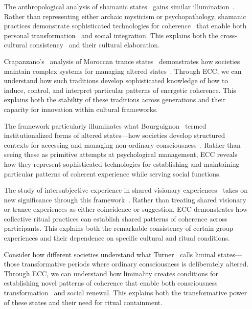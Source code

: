 The anthropological analysis of shamanic states~ gains similar illumination~\cite{noll1983shamanism,noll1985mental}. Rather than representing either archaic mysticism or psychopathology, shamanic practices demonstrate sophisticated technologies for coherence~ that enable both personal transformation~ and social integration. This explains both the cross-cultural consistency~ and their cultural elaboration.

Crapanzano's~\cite{crapanzano1973hamadsha} analysis of Moroccan trance states~ demonstrates how societies maintain complex systems for managing altered states~\cite{houseman1998naven}. Through ECC, we can understand how such traditions develop sophisticated knowledge of how to induce, control, and interpret particular patterns of energetic coherence. This explains both the stability of these traditions across generations and their capacity for innovation within cultural frameworks.

The framework particularly illuminates what Bourguignon~\cite{bourguignon1976possession} termed institutionalized forms of altered states—how societies develop structured contexts for accessing and managing non-ordinary consciousness~\cite{rappaport1999ritual}. Rather than seeing these as primitive attempts at psychological management, ECC reveals how they represent sophisticated technologies for establishing and maintaining particular patterns of coherent experience while serving social functions.

The study of intersubjective experience in shared visionary experiences~ takes on new significance through this framework~\cite{rouget1985music,thompson2001radical}. Rather than treating shared visionary or trance experiences as either coincidence or suggestion, ECC demonstrates how collective ritual practices can establish shared patterns of coherence across participants. This explains both the remarkable consistency of certain group experiences and their dependence on specific cultural and ritual conditions.

Consider how different societies understand what Turner~\cite{turner1969ritual,turner1982ritual} calls liminal states—those transformative periods where ordinary consciousness is deliberately altered. Through ECC, we can understand how liminality creates conditions for establishing novel patterns of coherence that enable both consciousness transformation~ and social renewal. This explains both the transformative power~ of these states and their need for ritual containment.

